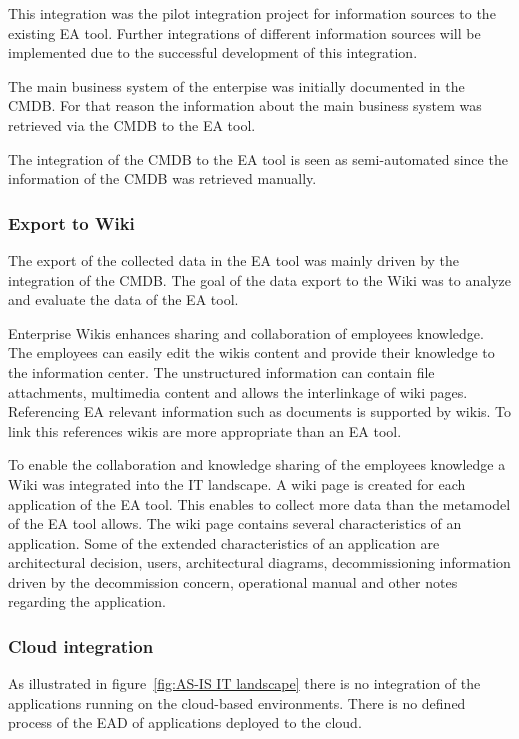 This integration was the pilot integration project for information sources to the existing EA tool. Further integrations of different information sources will be implemented due to the successful development of this integration.

The main business system of the enterpise was initially documented in the CMDB. For that reason the information about the main business system was retrieved via the CMDB to the EA tool.

The integration of the CMDB to the EA tool is seen as semi-automated since the information of the CMDB was retrieved manually.

\subsubsection{Export to Wiki}

The export of the collected data in the EA tool was mainly driven by the integration of the CMDB. The goal of the data export to the Wiki was to analyze and evaluate the data of the EA tool. 

Enterprise Wikis enhances sharing and collaboration of employees knowledge. The employees can easily edit the wikis content and provide their knowledge to the information center. The unstructured information can contain file attachments, multimedia content and allows the interlinkage of wiki pages. Referencing EA relevant information such as documents is supported by wikis. To link this references wikis are more appropriate than an EA tool. \cite{Fiedler2013}

To enable the collaboration and knowledge sharing of the employees knowledge a Wiki was integrated into the IT landscape. A wiki page is created for each application of the EA tool. This enables to collect more data than the metamodel of the EA tool allows. The wiki page contains several characteristics of an application. Some of the extended characteristics of an application are architectural decision, users, architectural diagrams, decommissioning information driven by the decommission concern, operational manual and other notes regarding the application.

\subsubsection{Cloud integration}

As illustrated in figure~\ref{fig:AS-IS IT landscape} there is no integration of the applications running on the cloud-based environments. There is no defined process of the EAD of applications deployed to the cloud.

